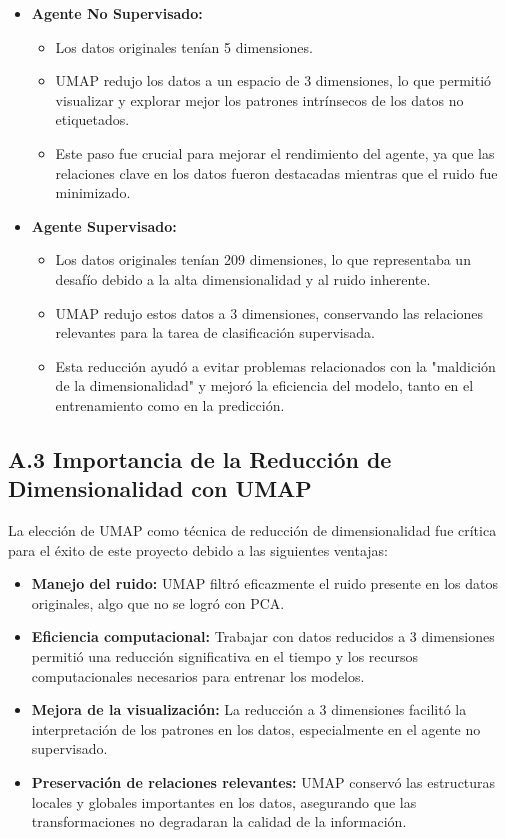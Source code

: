 \documentclass[12pt,a4paper]{article}
\begin{document}
\begin{itemize}
    \item \textbf{Agente No Supervisado:}
    \begin{itemize}
        \item Los datos originales tenían 5 dimensiones.
        \item UMAP redujo los datos a un espacio de 3 dimensiones, lo que permitió visualizar y explorar mejor los patrones intrínsecos de los datos no etiquetados.
        \item Este paso fue crucial para mejorar el rendimiento del agente, ya que las relaciones clave en los datos fueron destacadas mientras que el ruido fue minimizado.
    \end{itemize}

    \item \textbf{Agente Supervisado:}
    \begin{itemize}
        \item Los datos originales tenían 209 dimensiones, lo que representaba un desafío debido a la alta dimensionalidad y al ruido inherente.
        \item UMAP redujo estos datos a 3 dimensiones, conservando las relaciones relevantes para la tarea de clasificación supervisada.
        \item Esta reducción ayudó a evitar problemas relacionados con la "maldición de la dimensionalidad" y mejoró la eficiencia del modelo, tanto en el entrenamiento como en la predicción.
    \end{itemize}
\end{itemize}

\subsection*{A.3 Importancia de la Reducción de Dimensionalidad con UMAP}
La elección de UMAP como técnica de reducción de dimensionalidad fue crítica para el éxito de este proyecto debido a las siguientes ventajas:
\begin{itemize}
    \item \textbf{Manejo del ruido:} UMAP filtró eficazmente el ruido presente en los datos originales, algo que no se logró con PCA.
    \item \textbf{Eficiencia computacional:} Trabajar con datos reducidos a 3 dimensiones permitió una reducción significativa en el tiempo y los recursos computacionales necesarios para entrenar los modelos.
    \item \textbf{Mejora de la visualización:} La reducción a 3 dimensiones facilitó la interpretación de los patrones en los datos, especialmente en el agente no supervisado.
    \item \textbf{Preservación de relaciones relevantes:} UMAP conservó las estructuras locales y globales importantes en los datos, asegurando que las transformaciones no degradaran la calidad de la información.
\end{itemize}
\end{document}

